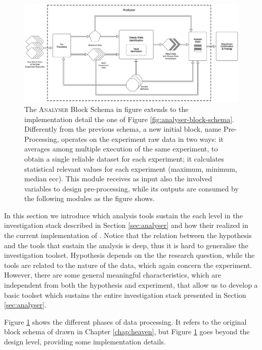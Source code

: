 \begin{figure}[tbh]
  \centering
	\includegraphics[width=\linewidth]{images/analyser-block-schema-impl}
	\caption[\textsc{Analyser} Block Schema: Implementation Detail Level]{The \textsc{Analyser} Block Schema in figure extends to the implementation detail the one of Figure \ref{fig:analyser-block-schema}. Differently from the previous schema, a new initial block, name Pre-Processing, operates on the experiment raw data in two ways: it averages among multiple execution of the same experiment, to obtain a single reliable dataset for each experiment; it calculates statistical relevant values for each experiment (maximum, minimum, median ecc). This module receives as input also the involved variables to design pre-processing, while its outputs are consumed by the following modules as the figure shows.}
  	\label{fig:analyser-block-schema-impl}
\end{figure}

\noindent In this section we introduce which analysis tools sustain the each level in the investigation stack described in Section \ref{sec:analyser} and how their realized in the current implementation of \name. Notice that the relation between the hypothesis and the tools that sustain the analysis is deep, thus it is hard to generalise the investigation toolset. Hypothesis depends on the the research question, while the tools are related to the nature of the data, which again concern the experiment.  However, there are some general meaningful characteristics, which are independent from both the hypothesis and experiment, that allow us to develop a basic toolset which sustains the entire investigation stack presented in Section \ref{sec:analyser}.

Figure \ref{fig:analyser-block-schema-impl} shows the different phases of data processing. It refers to the original block schema of drawn in Chapter \ref{chap:heaven}, but Figure \ref{fig:analyser-block-schema-impl} goes beyond the design level, providing some implementation details. 

